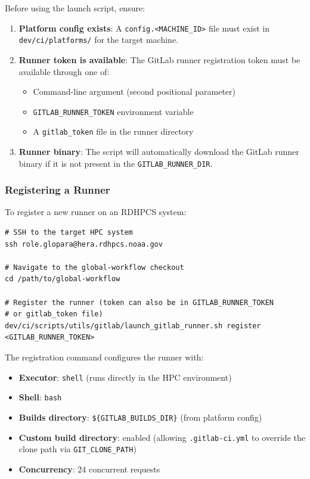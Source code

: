 \documentclass[11pt,letterpaper,twoside]{article}
\begin{document}
Before using the launch script, ensure:

\begin{enumerate}[leftmargin=1.5em]
  \item \textbf{Platform config exists}: A \texttt{config.<MACHINE\_ID>} file
    must exist in \texttt{dev/ci/platforms/} for the target machine.
  \item \textbf{Runner token is available}: The GitLab runner registration token
    must be available through one of:
    \begin{itemize}
      \item Command-line argument (second positional parameter)
      \item \texttt{GITLAB\_RUNNER\_TOKEN} environment variable
      \item A \texttt{gitlab\_token} file in the runner directory
    \end{itemize}
  \item \textbf{Runner binary}: The script will automatically download the
    GitLab runner binary if it is not present in the
    \texttt{GITLAB\_RUNNER\_DIR}.
\end{enumerate}

\subsubsection{Registering a Runner}

To register a new runner on an RDHPCS system:

\begin{lstlisting}[style=bash]
# SSH to the target HPC system
ssh role.glopara@hera.rdhpcs.noaa.gov

# Navigate to the global-workflow checkout
cd /path/to/global-workflow

# Register the runner (token can also be in GITLAB_RUNNER_TOKEN
# or gitlab_token file)
dev/ci/scripts/utils/gitlab/launch_gitlab_runner.sh register <GITLAB_RUNNER_TOKEN>
\end{lstlisting}

The registration command configures the runner with:
\begin{itemize}[leftmargin=1.5em]
  \item \textbf{Executor}: \texttt{shell} (runs directly in the HPC environment)
  \item \textbf{Shell}: \texttt{bash}
  \item \textbf{Builds directory}: \texttt{\$\{GITLAB\_BUILDS\_DIR\}} (from platform config)
  \item \textbf{Custom build directory}: enabled (allowing \texttt{.gitlab-ci.yml}
    to override the clone path via \texttt{GIT\_CLONE\_PATH})
  \item \textbf{Concurrency}: 24 concurrent requests
\end{itemize}
\end{document}
